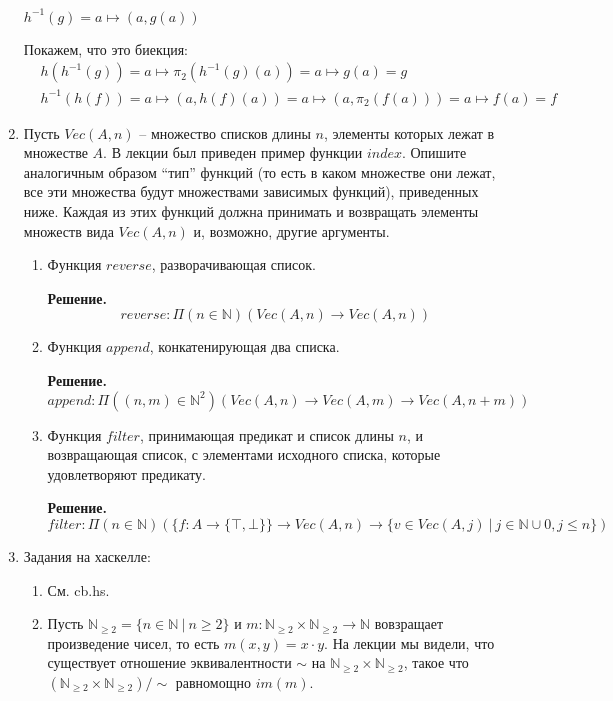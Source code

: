 \begin{enumerate}
$h^{-1}(g) = a \mapsto (a, g(a))$

Покажем, что это биекция:
\begin{align*}
	& h(h^{-1}(g)) = a \mapsto \pi_2(h^{-1}(g)(a)) = a \mapsto g(a) = g \\
	& h^{-1}(h(f)) = a \mapsto (a, h(f)(a)) = a \mapsto (a, \pi_2(f(a))) = a \mapsto f(a) = f
\end{align*}

\item \label{it:vec}
    Пусть $Vec(A,n)$ -- множество списков длины $n$, элементы которых лежат в множестве $A$. В лекции был 
    приведен пример функции $index$. Опишите аналогичным образом ``тип'' функций (то есть в каком множестве 
    они лежат, все эти множества будут множествами зависимых функций), приведенных ниже. Каждая из этих 
    функций должна принимать и возвращать элементы множеств вида $Vec(A,n)$ и, возможно, другие аргументы.
\begin{enumerate}
\item Функция $reverse$, разворачивающая список.

\textbf{Решение.} $$reverse : \Pi(n \in \mathbb{N}) (Vec(A, n) \rightarrow Vec(A, n)) $$

\item Функция $append$, конкатенирующая два списка.

\textbf{Решение.} $$append : \Pi((n,m) \in \mathbb{N}^2) (Vec(A, n) \rightarrow Vec(A, m) \rightarrow Vec(A, 
n + m)) $$

\item Функция $filter$, принимающая предикат и список длины $n$, и возвращающая список, с элементами 
исходного списка, которые удовлетворяют предикату.

\textbf{Решение.} $$filter : \Pi(n \in \mathbb{N}) (\{f:A\rightarrow \{\top, \bot\}\} \rightarrow Vec(A, n) 
\rightarrow \{v \in Vec(A, j) \ \big| \ j \in \mathbb{N}\cup {0}, j \leqslant n\}) $$
\end{enumerate}

\item Задания на хаскелле:
\begin{enumerate}
\item См. cb.hs.
\item Пусть $\mathbb{N}_{\geq 2} = \{ n \in \mathbb{N}\ |\ n \geq 2 \}$ и $m : \mathbb{N}_{\geq 2} \times 
\mathbb{N}_{\geq 2} \to \mathbb{N}$ вовзращает произведение чисел, то есть $m(x,y) = x \cdot y$.
    На лекции мы видели, что существует отношение эквивалентности $\sim$ на $\mathbb{N}_{\geq 2} \times 
    \mathbb{N}_{\geq 2}$, такое что $(\mathbb{N}_{\geq 2} \times \mathbb{N}_{\geq 2})/\!\!\sim$ равномощно 
    $im(m)$.
    

\end{enumerate}
\end{enumerate}
